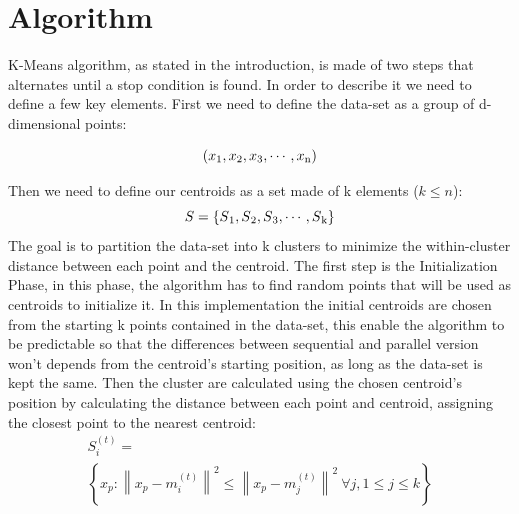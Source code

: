 \documentclass[10pt,twocolumn,letterpaper]{article}
\begin{document}
\vspace{3cm}

\section{Algorithm}

K-Means algorithm, as stated in the introduction, is made of two steps that alternates until a stop condition is found.\newline
In order to describe it we need to define a few key elements.\newline
First we need to define the data-set as a group of d-dimensional points:\newline

\begin{equation} 
\label{eq:Data-Set}
(x\textsubscript{1},x\textsubscript{2},x\textsubscript{3},\cdots,x\textsubscript{n})
\end{equation}

Then we need to define our centroids as a set made of k elements ($k \leq n$):\newline
\begin{equation} 
\label{eq:Data-Set}
S=\{S\textsubscript{1},S\textsubscript{2},S\textsubscript{3},\cdots,S\textsubscript{k}\}
\end{equation}
The goal is to partition the data-set into k clusters to minimize the within-cluster distance between each point and the centroid.
\newline
The first step is the Initialization Phase, in this phase, the algorithm has to find random points that will be used as 
centroids to initialize it.\newline
In this implementation the initial centroids are chosen from the starting k points contained in the data-set, this enable the algorithm
to be predictable so that the differences between sequential and parallel version won't depends from the centroid's starting position,
as long as the data-set is kept the same.
\newline
Then the cluster are calculated using the chosen centroid's position by calculating the distance between each point and centroid, 
assigning the closest point to the nearest centroid:\newline
\begin{multline}
\label{eq:Centroids}
S_i^{(t)} =\\
\left \{ x_p : \left \| x_p - m^{(t)}_i \right \|^2 \le \left \| x_p - m^{(t)}_j \right \|^2 \ \forall j, 1 \le j \le k \right\}\\
\end{multline}
\end{document}
